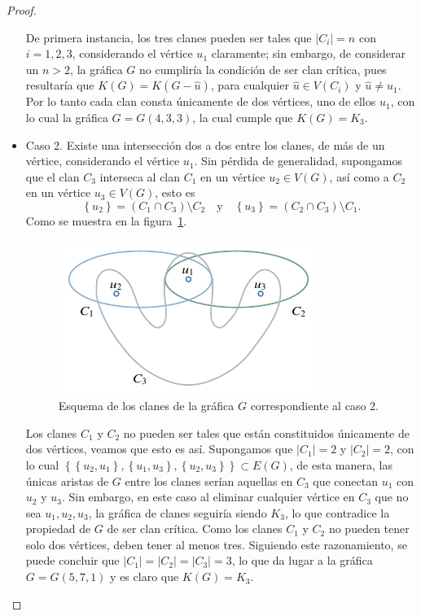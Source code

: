 \documentclass[12pt]{book}
\theoremstyle{definition}
\begin{document}
\begin{proof}
\begin{itemize}
De primera instancia, los tres clanes pueden ser tales que $|C_i|=n$ con $i=1,2,3$, considerando el vértice $u_1$ claramente; sin embargo, de considerar un $n>2$, la gráfica $G$ no cumpliría la condición de ser clan crítica, pues resultaría que $K(G)=K(G-\hat{u})$, para cualquier $\hat{u}\in V(C_i)$ y $\hat{u}\neq u_1$. Por lo tanto cada clan consta únicamente de dos vértices, uno de ellos $u_1$, con lo cual la gráfica $G=G(4,3,3)$, la cual cumple que $K(G)=K_3$.

\item Caso 2.
Existe una intersección dos a dos entre los clanes, de más de un vértice, considerando el vértice $u_1$. Sin pérdida de generalidad, supongamos que el clan $C_3$ interseca al clan $C_1$ en un vértice $u_2\in V(G)$, así como a $C_2$ en un vértice $u_3\in V(G)$, esto es 
\begin{equation*}
\left\{u_2\right\}=(C_1\cap C_3)\setminus C_2 \quad \text{y} \quad \left\{u_3\right\}=(C_2\cap C_3)\setminus C_1.
\end{equation*}
Como se muestra en la figura~\ref{F2}.

\begin{figure}[!htbp]
	\centering
	\includegraphics[scale=1.2]{Fig2.pdf}
	\caption{Esquema de los clanes de la gráfica $G$ correspondiente al caso 2.\label{F2}}
\end{figure}

Los clanes $C_1$ y $C_2$ no pueden ser tales que están constituidos únicamente de dos vértices, veamos que esto es así. Supongamos que $|C_1|=2$ y $|C_2|=2$, con lo cual $\left\{\left\{u_2,u_1\right\},\left\{u_1,u_3\right\},\left\{u_2,u_3\right\}\right\}\subset E(G)$, de esta manera, las únicas aristas de $G$ entre los clanes serían aquellas en $C_3$ que conectan $u_1$ con $u_2$ y $u_3$. Sin embargo, en este caso al eliminar cualquier vértice en $C_3$ que no sea $u_1,u_2,u_3$, la gráfica de clanes seguiría siendo $K_3$, lo que contradice la propiedad de $G$ de ser clan crítica. Como los clanes $C_1$ y $C_2$ no pueden tener solo dos vértices, deben tener al menos tres.
Siguiendo este razonamiento, se puede concluir que $|C_1|=|C_2|=|C_3|=3$, lo que da lugar a la gráfica $G=G(5,7,1)$ y es claro que $K(G)=K_3$.



\end{itemize}
\end{proof}
\end{document}
